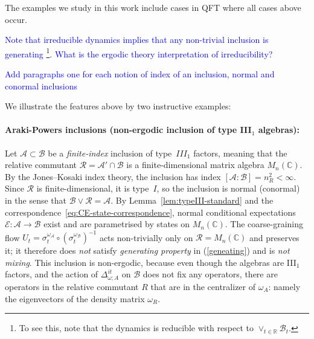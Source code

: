\documentclass[a4paper,11pt]{article}
\theoremstyle{definition}
\newcommand{\mA}{\mathcal{A}}
\newcommand{\mB}{\mathcal{B}}
\newcommand{\NL}[1]{\textcolor{blue}{#1}}
\newcommand{\mE}{\mathcal{E}}
\begin{document}
The examples we study in this work include cases in QFT where all cases above occur.
 

\NL{Note that irreducible dynamics implies that any non-trivial inclusion is generating \footnote{To see this, note that the dynamics is reducible with respect to $\vee_{t\in \mathbb{R}}\mB_t$.}.} \NL{What is the ergodic theory interpretation of irreducibility?}

\NL{Add paragraphs one for each notion of index of an inclusion, normal and conormal inclusions}


We illustrate the features above by two instructive examples:

\paragraph{Araki-Powers inclusions (non-ergodic inclusion of type III$_1$ algebras):}

Let $\mA\subset \mB$ be a \emph{finite-index} inclusion of type~$III_1$
factors, meaning that the relative commutant $\mathcal{R}=\mA'\cap \mB$
is a finite-dimensional matrix algebra $M_n(\mathbb{C})$.  By the Jones--Kosaki index
theory, the inclusion has index $[\mathcal{A}:\mathcal{B}]=n_R^2<\infty$.  Since $\mathcal{R}$
is finite-dimensional, it is type~$I$, so the inclusion is normal (conormal) in the sense
that $\mathcal{B}\vee\mathcal{R}=\mathcal{A}$.  By Lemma~\ref{lem:typeIII-standard} and the
correspondence~\eqref{eq:CE-state-correspondence}, normal conditional expectations
$\mE:\mA\to \mB$ exist and are parametrised by states on $M_n(\mathbb{C})$.
The coarse-graining flow $U_t=\sigma_t^{\omega_\mathcal{A}}\circ(\sigma_t^{\omega_\mathcal{B}})^{-1}$
acts non-trivially only on $\mathcal{R}=M_n(\mathbb{C})$ and preserves it; it therefore
does \emph{not} satisfy {\it generating property} in (\ref{geneating}) and
is \emph{not mixing}.  This inclusion is non-ergodic, because even though the algebras are III$_1$ factors, and the action of $\Delta_{\omega;A}^{it}$ on $\mB$ does not fix any operators, there are operators in the relative commutant $R$ that are in the centralizer of $\omega_A$: namely the eigenvectors of the density matrix $\omega_R$.
\end{document}
